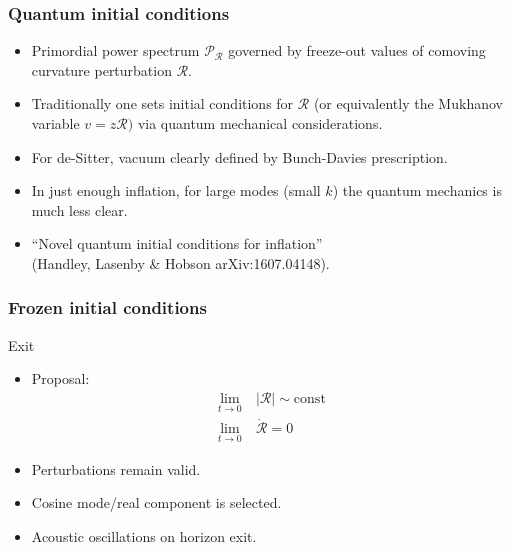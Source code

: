 \documentclass[%
]{beamer}
\begin{document}
\begin{frame}
    \frametitle{Quantum initial conditions}
    \begin{itemize}
        \item Primordial power spectrum $\mathcal{P}_\mathcal{R}$ governed by freeze-out values of comoving curvature perturbation $\mathcal{R}$.
        \item Traditionally one sets initial conditions for $\mathcal{R}$ (or equivalently the Mukhanov variable $v=z\mathcal{R})$ via quantum mechanical considerations.
        \item For de-Sitter, vacuum clearly defined by Bunch-Davies prescription.
        \item In just enough inflation, for large modes (small $k$) the quantum mechanics is much less clear.
        \item ``Novel quantum initial conditions for inflation''\\
            (Handley, Lasenby \& Hobson arXiv:1607.04148).
    \end{itemize}
\end{frame}

\begin{frame}
    \frametitle{Frozen initial conditions}

    \begin{figright}[0.3]{Exit}
        \begin{itemize}
            \item Proposal: 
                \begin{align}
                    \lim\limits_{t\to 0}&\:|\mathcal{R}|\sim\mathrm{const} \nonumber\\
                    \lim\limits_{t\to 0}&\:\dot{\mathcal{R}}=0 \nonumber
                \end{align}
            \item Perturbations remain valid.
            \item Cosine mode/real component is selected.
            \item Acoustic oscillations on horizon exit.
        \end{itemize}
    \end{figright}
\end{frame}
\end{document}
